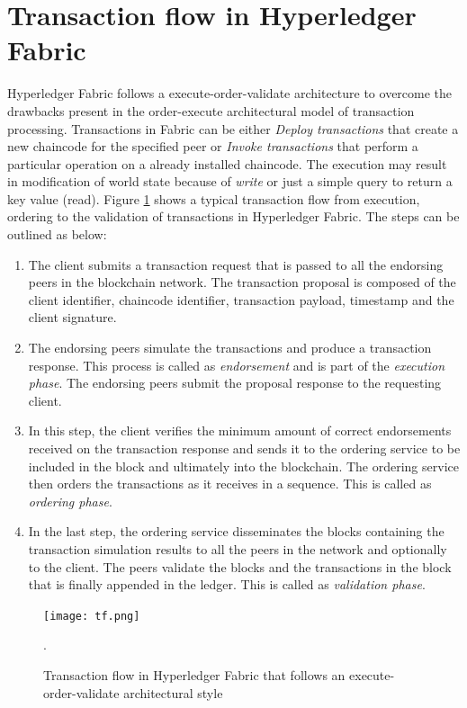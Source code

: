 \documentclass[
  a4paper,  %
  twoside,  %
  bibliography=totoc,
  headsepline,
  cleardoublepage=empty,
  parskip=half,
  draft=false
]{scrbook}
\begin{document}
\section{Transaction flow in Hyperledger Fabric}
Hyperledger Fabric follows a execute-order-validate architecture to overcome the drawbacks present in the order-execute architectural model of transaction processing. Transactions in Fabric can be either \textit{Deploy transactions} that create a new chaincode for the specified peer or \textit{Invoke transactions} that perform a particular operation on a already installed chaincode. The execution may result in modification of world state because of \textit{write} or just a simple query to return a key value (read). Figure \ref{fig:tf} shows a typical transaction flow from execution, ordering to the validation of transactions in Hyperledger Fabric. The steps can be outlined as below:
\begin{enumerate}
    \item The client submits a transaction request that is passed to all the endorsing peers in the blockchain network. The transaction proposal is composed of the client identifier, chaincode identifier, transaction payload, timestamp and the client signature.
    \item The endorsing peers simulate the transactions and produce a transaction response. This process is called as \textit{endorsement} and is part of the \textit{execution phase}. The endorsing peers submit the proposal response to the requesting client.
    \item In this step, the client verifies the minimum amount of correct endorsements received on the transaction response and sends it to the ordering service to be included in the block and ultimately into the blockchain. The ordering service then orders the transactions as it receives in a sequence. This is called as \textit{ordering phase}.
    \item In the last step, the ordering service disseminates the blocks containing the transaction simulation results to all the peers in the network and optionally to the client. The peers validate the blocks and the transactions in the block that is finally appended in the ledger. This is called as \textit{validation phase}.
\end{enumerate}

\begin{figure}[t!]
\begin{center}
\texttt{[image: tf.png]}
\caption{Transaction flow in Hyperledger Fabric that follows an execute-order-validate architectural style \cite{hfarc}}.
\label{fig:tf}
\end{center}
\end{figure}
\end{document}

